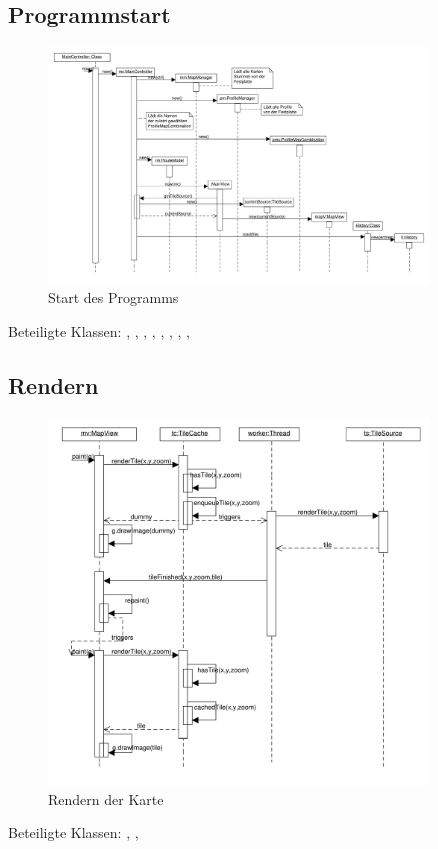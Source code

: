 \documentclass[a4paper, 11pt]{article}
\begin{document}
\subsection{Programmstart}
\begin{figure}[H]
\centering
\includegraphics[angle=90, width=0.9\textwidth]{StartSequenz}
\caption{Start des Programms}
\label{fig:sequenz_start}
\end{figure}
Beteiligte Klassen: , , , , , , , , 

\subsection{Rendern}
\begin{figure}[H]
\centering
\includegraphics[width=0.9\textwidth]{RenderSequenz}
\caption{Rendern der Karte}
\label{fig:sequenz_rendern}
\end{figure}
Beteiligte Klassen: , , 
\end{document}
